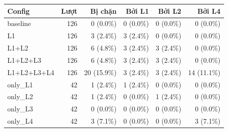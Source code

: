 \begin{tabular}{lrrrrr}
\toprule
Config & Lượt & Bị chặn & Bởi L1 & Bởi L2 & Bởi L4 \\
\midrule
baseline & 126 & 0 (0.0\%) & 0 (0.0\%) & 0 (0.0\%) & 0 (0.0\%) \\
L1 & 126 & 3 (2.4\%) & 3 (2.4\%) & 0 (0.0\%) & 0 (0.0\%) \\
L1+L2 & 126 & 6 (4.8\%) & 3 (2.4\%) & 3 (2.4\%) & 0 (0.0\%) \\
L1+L2+L3 & 126 & 6 (4.8\%) & 3 (2.4\%) & 3 (2.4\%) & 0 (0.0\%) \\
L1+L2+L3+L4 & 126 & 20 (15.9\%) & 3 (2.4\%) & 3 (2.4\%) & 14 (11.1\%) \\
only\_L1 & 42 & 1 (2.4\%) & 1 (2.4\%) & 0 (0.0\%) & 0 (0.0\%) \\
only\_L2 & 42 & 1 (2.4\%) & 0 (0.0\%) & 1 (2.4\%) & 0 (0.0\%) \\
only\_L3 & 42 & 0 (0.0\%) & 0 (0.0\%) & 0 (0.0\%) & 0 (0.0\%) \\
only\_L4 & 42 & 3 (7.1\%) & 0 (0.0\%) & 0 (0.0\%) & 3 (7.1\%) \\
\bottomrule
\end{tabular}
